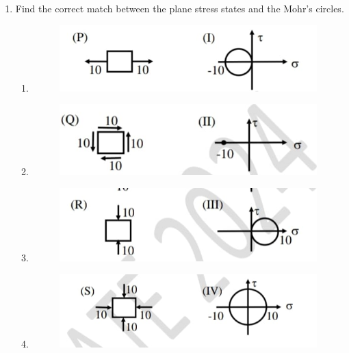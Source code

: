 \documentclass[journal,12pt,onecolumn]{article}
\theoremstyle{remark}
\begin{document}
\begin{enumerate}
    \item Find the correct match between the plane stress states and the Mohr's circles.
    \begin{enumerate}
        \item \begin{figure}[H]
        \centering
        \includegraphics[width=0.7\columnwidth]{figs/1Q38a.jpg}
        \caption{}
        \label{fig:q39}
    \end{figure}
    \item \begin{figure}[H]
        \centering
        \includegraphics[width=0.7\columnwidth]{figs/1Q38b.jpg}
        \caption{}
        \label{fig:q39}
    \end{figure}
    \item \begin{figure}[H]
        \centering
        \includegraphics[width=0.7\columnwidth]{figs/1Q38c.jpg}
        \caption{}
        \label{fig:q39}
    \end{figure}
    \item \begin{figure}[H]
        \centering
        \includegraphics[width=0.7\columnwidth]{figs/1Q38d.jpg}
        \caption{}
        \label{fig:q39}
    \end{figure}    
    \end{enumerate}
    

\end{enumerate}
\end{document}
